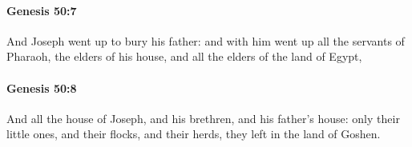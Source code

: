 		\paragraph{Genesis 50:7} %
			\label{GENESIS-50-7}

			And Joseph went up to bury his father: and with him went up all the servants of Pharaoh, the elders of his house, and all the elders of the land of Egypt,


		\paragraph{Genesis 50:8} %
			\label{GENESIS-50-8}

			And all the house of Joseph, and his brethren, and his father's house: only their little ones, and their flocks, and their herds, they left in the land of Goshen.


